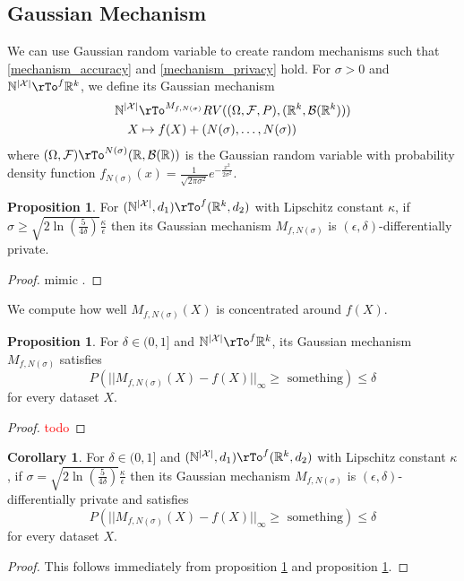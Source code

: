 \documentclass[12pt]{amsart}
\theoremstyle{definition}
\newtheorem{corollary}[theorem]{Corollary}
\newtheorem{proposition}[theorem]{Proposition}
\begin{document}
\subsection{Gaussian Mechanism} \label{gaussian_mechanism} We can use Gaussian random variable to create random mechanisms such that \ref{mechanism_accuracy} and \ref{mechanism_privacy} hold.
\dfn \label{dfn_gaussian_mechanism} For $\sigma > 0$ and $\mathbb{N}^{|\mathcal{X}|} \rTo^f \mathbb{R}^k$, we define its Gaussian mechanism
\begin{align*}
\mathbb{N}^{|\mathcal{X}|} & \rTo^{M_{f, N(\sigma)}} RV((\Omega, \mathcal{F}, P), (\mathbb{R}^k, \mathcal{B}(\mathbb{R}^k))) \\
X & \mapsto f(X) + (N(\sigma), \dots, N(\sigma)) \\
\end{align*}
where $(\Omega, \mathcal{F}) \rTo^{N(\sigma)} (\mathbb{R}, \mathcal{B}(\mathbb{R}))$ is the Gaussian random variable with probability density function $f_{N(\sigma)}(x) = \frac{1}{\sqrt{2 \pi \sigma^2}} e^{- \frac{x^2}{2 \sigma^2}}$.

\begin{proposition} \label{Gaussian_mechanism_privacy} For $(\mathbb{N}^{|\mathcal{X}|}, d_1) \rTo^f (\mathbb{R}^k, d_2)$ with Lipschitz constant $\kappa$, if $\sigma \geq \sqrt{2 \ln(\frac{5}{4 \delta})} \frac{\kappa}{\epsilon}$ then its Gaussian mechanism $M_{f, N(\sigma)}$ is $(\epsilon, \delta)$-differentially private.
\end{proposition}
\begin{proof} mimic \cite[appendix A]{algorithmic_foundations}.
\end{proof}

We compute how well $M_{f, N(\sigma)}(X)$ is concentrated around $f(X)$.

\begin{proposition} \label{Gaussian_mechanism_accuracy} For $\delta \in (0, 1]$ and $\mathbb{N}^{|\mathcal{X}|} \rTo^f \mathbb{R}^k$, its Gaussian mechanism $M_{f, N(\sigma)}$ satisfies
$$P(||M_{f, N(\sigma)}(X) - f(X)||_{\infty} \geq \text{ something}) \leq \delta$$
for every dataset $X$.
\end{proposition}
\begin{proof} \textcolor{red}{todo}
\end{proof}

\begin{corollary} \label{Gaussian_mechanism_accuracy_one_case} For $\delta \in (0, 1]$ and $(\mathbb{N}^{|\mathcal{X}|}, d_1) \rTo^f (\mathbb{R}^k, d_2)$ with Lipschitz constant $\kappa$, if $\sigma = \sqrt{2 \ln(\frac{5}{4 \delta})} \frac{\kappa}{\epsilon}$ then its Gaussian mechanism $M_{f, N(\sigma)}$ is $(\epsilon, \delta)$-differentially private and satisfies
$$P(||M_{f, N(\sigma)}(X) - f(X)||_{\infty} \geq \text{ something}) \leq \delta$$
for every dataset $X$.
\end{corollary}
\begin{proof} This follows immediately from proposition \ref{Gaussian_mechanism_privacy} and proposition \ref{Gaussian_mechanism_accuracy}.
\end{proof}
\end{document}
